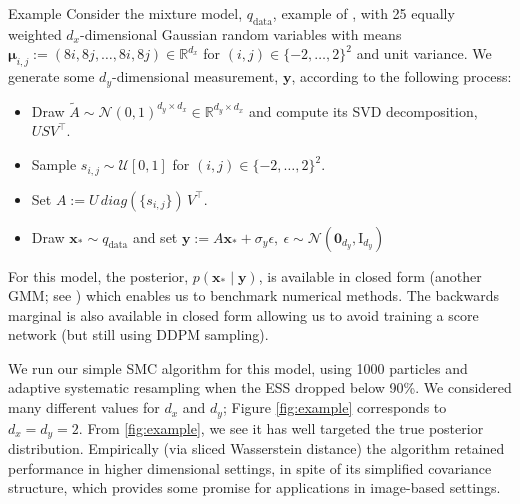 \documentclass[final]{beamer}
\newlength{\colwidth}
\begin{document}
\begin{frame}[t]
\begin{columns}[t]
\begin{column}{\colwidth}
\begin{exampleblock}{Example}
        Consider the mixture model, $q_{\text{data}}$, example of \cite{cardosoMonteCarloGuided2023},
        with 25 equally weighted $d_x$-dimensional Gaussian random variables with means
        $\mathbf{\mu}_{i,j} := (8i, 8j, \dots, 8i, 8j) \in \mathbb{R}^{d_x}$
        for $(i, j)\in \{-2, \ldots, 2\}^2$ and unit variance.
        We generate some $d_y$-dimensional measurement, $\mathbf{y}$, according to the following process:
        \vspace{-1cm}
        \begin{itemize}
            \item Draw $\tilde{A} \sim \mathcal{N}(0, 1)^{d_y \times d_x} \in \mathbb{R}^{d_y \times d_x}$
            and compute its SVD decomposition, $USV^\top$.
            \item Sample $s_{i,j} \sim \mathcal{U}[0,1]$ for $(i,j) \in \{-2, \dots, 2\}^2$.
            \item Set $A := U\, diag(\{s_{i,j}\})\, V^\top$.
            \item Draw $\mathbf{x}_* \sim q_{\text{data}}$ and set $\mathbf{y} := A\mathbf{x}_* + \sigma_y\epsilon,\ \epsilon \sim \mathcal{N}(\mathbf{0}_{d_y}, \mathrm{I}_{d_y})$
        \end{itemize}
        For this model, the posterior, $p(\mathbf{x}_* \mid \mathbf{y})$, is available in closed form
        (another GMM; see \cite{cardosoMonteCarloGuided2023}) which enables us to benchmark
        numerical methods. The backwards marginal is also available in closed form allowing
        us to avoid training a score network (but still using DDPM sampling).
    
    
        We run our simple SMC algorithm for this model, using 1000 particles and 
        adaptive systematic resampling when the ESS dropped below 90\%.
        We considered many different values for $d_x$ and $d_y$; Figure \ref{fig:example}
        corresponds to $d_x = d_y = 2$.
        From \ref{fig:example}, we see it has well targeted the true posterior distribution.
        Empirically (via sliced Wasserstein distance) the algorithm retained performance in
        higher dimensional settings, in spite of its simplified covariance
        structure, which provides some promise for applications in image-based settings.


\end{exampleblock}
\end{column}
\end{columns}
\end{frame}
\end{document}
